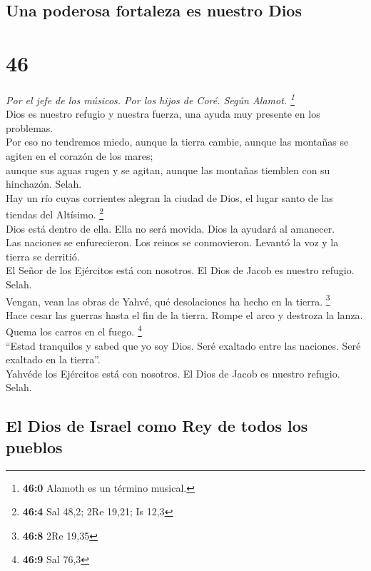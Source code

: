\hypertarget{una-poderosa-fortaleza-es-nuestro-dios}{%
\subsection{Una poderosa fortaleza es nuestro
Dios}\label{una-poderosa-fortaleza-es-nuestro-dios}}

\hypertarget{section-44}{%
\section{46}\label{section-44}}

\emph{Por el jefe de los músicos. Por los hijos de Coré. Según Alamot.
\footnote{\textbf{46:0} Alamoth es un término musical.}}\\
 Dios es nuestro refugio y nuestra fuerza, una ayuda muy
presente en los problemas.\\
 Por eso no tendremos miedo, aunque la tierra cambie,
aunque las montañas se agiten en el corazón de los mares;\\
 aunque sus aguas rugen y se agitan, aunque las montañas
tiemblen con su hinchazón. Selah.\\
 Hay un río cuyas corrientes alegran la ciudad de Dios, el
lugar santo de las tiendas del Altísimo. \footnote{\textbf{46:4} Sal
  48,2; 2Re 19,21; Is 12,3}\\
 Dios está dentro de ella. Ella no será movida. Dios la
ayudará al amanecer.\\
 Las naciones se enfurecieron. Los reinos se conmovieron.
Levantó la voz y la tierra se derritió.\\
 El Señor de los Ejércitos está con nosotros. El Dios de
Jacob es nuestro refugio. Selah.\\
 Vengan, vean las obras de Yahvé, qué desolaciones ha
hecho en la tierra. \footnote{\textbf{46:8} 2Re 19,35}\\
 Hace cesar las guerras hasta el fin de la tierra. Rompe
el arco y destroza la lanza. Quema los carros en el fuego. \footnote{\textbf{46:9}
  Sal 76,3}\\
 ``Estad tranquilos y sabed que yo soy Dios. Seré
exaltado entre las naciones. Seré exaltado en la tierra''.\\
 Yahvéde los Ejércitos está con nosotros. El Dios de
Jacob es nuestro refugio. Selah.

\hypertarget{el-dios-de-israel-como-rey-de-todos-los-pueblos}{%
\subsection{El Dios de Israel como Rey de todos los
pueblos}\label{el-dios-de-israel-como-rey-de-todos-los-pueblos}}

